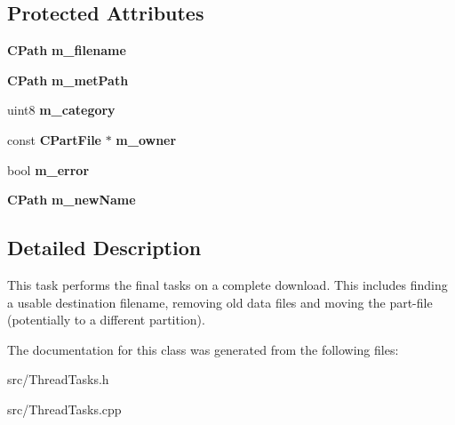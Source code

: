 \subsection*{Protected Attributes}
\begin{DoxyCompactItemize}
\item 
{\bf CPath} {\bf m\_\-filename}\label{classCCompletionTask_a2b8ccc9ddc0362318c1d468d1e81a0c0}

\item 
{\bf CPath} {\bf m\_\-metPath}\label{classCCompletionTask_ad8f54113f38f066b16405a994150da84}

\item 
uint8 {\bf m\_\-category}\label{classCCompletionTask_a08f82806fcc608025df11bf435256425}

\item 
const {\bf CPartFile} $\ast$ {\bf m\_\-owner}\label{classCCompletionTask_a60166a0cbf9a8ea62f9940b589607583}

\item 
bool {\bf m\_\-error}\label{classCCompletionTask_a1d2ee5633753e4df2ff070565d1c1a84}

\item 
{\bf CPath} {\bf m\_\-newName}\label{classCCompletionTask_aee9103e0c21d106ae6156cf7c04a26f0}

\end{DoxyCompactItemize}


\subsection{Detailed Description}
This task performs the final tasks on a complete download. This includes finding a usable destination filename, removing old data files and moving the part-\/file (potentially to a different partition). 

The documentation for this class was generated from the following files:\begin{DoxyCompactItemize}
\item 
src/ThreadTasks.h\item 
src/ThreadTasks.cpp\end{DoxyCompactItemize}
